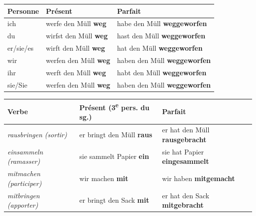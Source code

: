 \documentclass[11pt]{article}
\newcommand{\all}[1]{\ifmmode\text{\textit{#1}}\else\begingroup\selectlanguage{ngerman}\itshape #1\endgroup\fi}
\begin{document}
\begin{center}
\begin{tabular}{|l|l|l|}
\hline
\rowcolor{popblueL} \textbf{Personne} & \textbf{Présent} & \textbf{Parfait} \\
\hline
ich & werfe den Müll \textbf{weg} & habe den Müll \textbf{weggeworfen} \\
\hline
du & wirfst den Müll \textbf{weg} & hast den Müll \textbf{weggeworfen} \\
\hline
er/sie/es & wirft den Müll \textbf{weg} & hat den Müll \textbf{weggeworfen} \\
\hline
wir & werfen den Müll \textbf{weg} & haben den Müll \textbf{weggeworfen} \\
\hline
ihr & werft den Müll \textbf{weg} & habt den Müll \textbf{weggeworfen} \\
\hline
sie/Sie & werfen den Müll \textbf{weg} & haben den Müll \textbf{weggeworfen} \\
\hline
\end{tabular}
\end{center}

\begin{center}
\begin{tabular}{|l|l|l|}
\hline
\rowcolor{popgreenL} \textbf{Verbe} & \textbf{Présent (3\textsuperscript{e} pers. du sg.)} & \textbf{Parfait} \\
\hline
\all{rausbringen} (sortir) & er bringt den Müll \textbf{raus} & er hat den Müll \textbf{rausgebracht} \\
\hline
\all{einsammeln} (ramasser) & sie sammelt Papier \textbf{ein} & sie hat Papier \textbf{eingesammelt} \\
\hline
\all{mitmachen} (participer) & wir machen \textbf{mit} & wir haben \textbf{mitgemacht} \\
\hline
\all{mitbringen} (apporter) & er bringt den Sack \textbf{mit} & er hat den Sack \textbf{mitgebracht} \\
\hline
\end{tabular}
\end{center}
\end{document}

